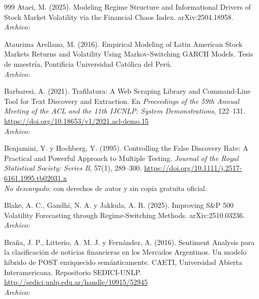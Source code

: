 \begin{thebibliography}{999}
Ataei, M. (2025). Modeling Regime Structure and Informational Drivers of Stock Market Volatility via the Financial Chaos Index. arXiv:2504.18958.
\\\textit{Archivo:} 

Ataurima Arellano, M. (2016). Empirical Modeling of Latin American Stock Markets Returns and Volatility Using Markov-Switching GARCH Models. Tesis de maestría, Pontificia Universidad Católica del Perú.
\\\textit{Archivo:} 

Barbaresi, A. (2021). Trafilatura: A Web Scraping Library and Command-Line Tool for Text Discovery and Extraction. En \emph{Proceedings of the 59th Annual Meeting of the ACL and the 11th IJCNLP: System Demonstrations}, 122--131. \url{https://doi.org/10.18653/v1/2021.acl-demo.15}
\\\textit{Archivo:} 

Benjamini, Y. y Hochberg, Y. (1995). Controlling the False Discovery Rate: A Practical and Powerful Approach to Multiple Testing. \emph{Journal of the Royal Statistical Society: Series B}, 57(1), 289--300. \url{https://doi.org/10.1111/j.2517-6161.1995.tb02031.x}
\\\textit{No descargado:} con derechos de autor y sin copia gratuita oficial.

Blake, A. C., Gandhi, N. A. y Jakkula, A. R. (2025). Improving S\&P 500 Volatility Forecasting through Regime-Switching Methods. arXiv:2510.03236.
\\\textit{Archivo:} 

Bra{\~n}a, J. P., Litterio, A. M. J. y Fern{\'a}ndez, A. (2016). Sentiment Analysis para la clasificaci{\'o}n de noticias financieras en los Mercados Argentinos. Un modelo h{\'i}brido de POST enriquecido sem{\'a}nticamente. CAETI, Universidad Abierta Interamericana. Repositorio SEDICI-UNLP. \url{http://sedici.unlp.edu.ar/handle/10915/52945}
\\\textit{Archivo:} 


\end{thebibliography}
